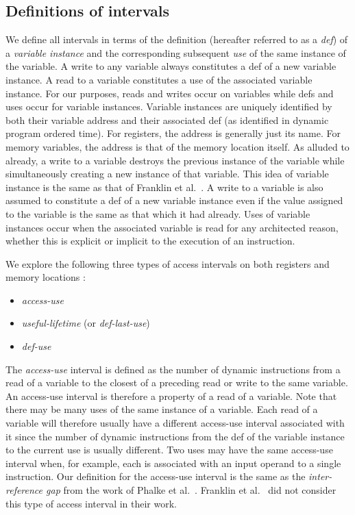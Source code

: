 \documentclass[10pt,dvips]{article}
\begin{document}
\subsection{Definitions of intervals}
%
We define all intervals in terms of the definition
(hereafter referred to as a \textit{def}) of a
\textit{variable instance} 
and the corresponding subsequent \textit{use} of the
same instance of the variable.
A write to any variable always constitutes a def of a new
variable instance.
A read to a variable constitutes a use of the associated
variable instance.
For our purposes, reads and writes occur on variables while
defs and uses occur for variable instances.
Variable instances are uniquely identified by both their variable 
address and their associated def (as identified in dynamic program
ordered time).
For registers, the address is generally just its name.  
For memory variables, the address is that of the memory
location itself.  
As alluded to already, a write to a variable 
destroys the previous instance of the variable while simultaneously
creating a new instance of that variable.  
This idea of variable instance is the same as that of 
Franklin et al.~\cite{Franklin92}.
A write to a variable is also assumed to constitute a def of a new
variable instance even if the
value assigned to the variable is the same as that which it
had already.
Uses of variable instances occur when the associated variable
is read for any architected reason, whether this is explicit
or implicit to the execution of an instruction.

We explore the following three types of access intervals on
both registers and memory locations :
%
\begin{itemize}
\vspace{-0.1in}
\item \textit{access-use}
\vspace{-0.1in}
\item \textit{useful-lifetime} (or \textit{def-last-use})
\vspace{-0.1in}
\item \textit{def-use}
\vspace{-0.1in}
\end{itemize}
%
The \textit{access-use} interval is defined as the number of
dynamic instructions from a read of a variable to the closest
of a preceding read or write to the same variable.
An access-use interval is therefore a property of a read of a variable.
Note that there may be many uses of the same instance of a variable.
Each read of a variable will therefore
usually have a different access-use interval associated with it
since the number of dynamic instructions from the def
of the variable instance to the current use is usually different.
Two uses may have the same access-use interval when,
for example, each is associated with an input operand to a single
instruction.
Our definition for the access-use interval is the same as the
\textit{inter-reference gap} from the work of 
Phalke et al.~\cite{phalke95gap}.
Franklin et al.~\cite{Franklin92} did not consider this type
of access interval in their work.
\end{document}

